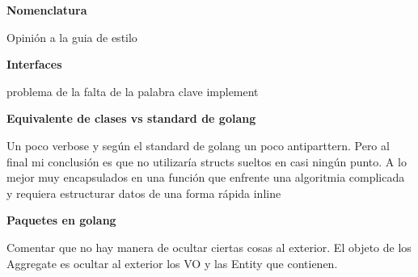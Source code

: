 \textbf{Nomenclatura}

Opinión a la guia de estilo

\textbf{Interfaces}

problema de la falta de la palabra clave implement

\textbf{Equivalente de clases vs standard de golang}

Un poco verbose y según el standard de golang un poco antiparttern. Pero al final mi conclusión es que no utilizaría structs sueltos en casi ningún punto. A lo mejor muy encapsulados en una función que enfrente una algoritmia complicada y requiera estructurar datos de una forma rápida inline

\textbf{Paquetes en golang}

Comentar que no hay manera de ocultar ciertas cosas al exterior. El objeto de los Aggregate es ocultar al exterior los VO y las Entity que contienen.